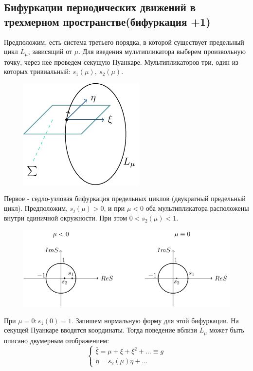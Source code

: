 \subsection{Бифуркации периодических движений в трехмерном пространстве(бифуркация +1)}
Предположим, есть система третьего порядка, в которой существует предельный цикл $L_{\mu}$, зависящий от $\mu$. Для введения мультипликатора выберем произвольную точку, через нее проведем секущую Пуанкаре. Мультипликаторов три, один из которых тривиальный: $s_1(\mu),~s_2(\mu)$.
\begin{figure} 
	\vspace{0.1em}
	\centering
	\includegraphics[scale=1]{fig/fig62.pdf}
	\vspace{-0.25em}
\end{figure}

Первое - седло-узловая бифуркация предельных циклов (двукратный предельный цикл). Предположим, $s_j(\mu)>0$, и при $\mu<0$ оба мультипликатора расположены внутри единичной окружности. При этом $0<s_2(\mu)<1$.
\begin{figure}[H]
	\centering
	\includegraphics[width=1\linewidth]{fig/fig63.pdf}   
\end{figure}

При $\mu=0: s_1(0)= 1$. Запишем нормальную форму для этой бифуркации. На секущей Пуанкаре вводятся координаты. Тогда поведение вблизи $L_{\mu}$ может быть описано двумерным отображением:
\begin{equation}
	\begin{cases}
		\stackrel{\_}{\xi}= \mu+\xi+\xi^2+\dots \equiv g\\
		\stackrel{\_}{\eta}= s_2(\mu)\eta+\dots
	\end{cases}
	\label{eq:109}	
\end{equation}

